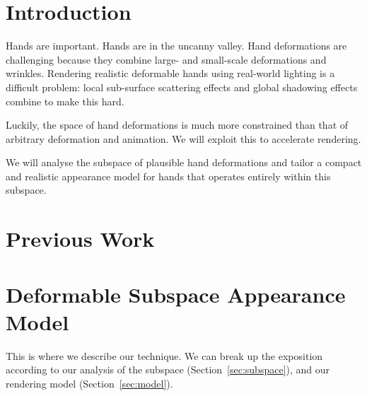 \documentclass[review]{acmsiggraph}
\begin{document}
\keywordlist


\TOGlinkslist


\copyrightspace


\section{Introduction}
\label{sec:introduction}

Hands are important. Hands are in the uncanny valley. Hand deformations are challenging because they combine large- and small-scale deformations and wrinkles. Rendering realistic deformable hands using real-world lighting is a difficult problem: local sub-surface scattering effects and global shadowing effects combine to make this hard.

Luckily, the space of hand deformations is much more constrained than that of arbitrary deformation and animation. We will exploit this to accelerate rendering.

We will analyse the subspace of plausible hand deformations and tailor a compact and realistic appearance model for hands that operates entirely within this subspace.

\section{Previous Work}
\label{sec:previous}



\section{Deformable Subspace Appearance Model}
\label{sec:approach}

This is where we describe our technique. We can break up the exposition according to our analysis of the subspace (Section~\ref{sec:subspace}), and our rendering model (Section~\ref{sec:model}).
\end{document}
